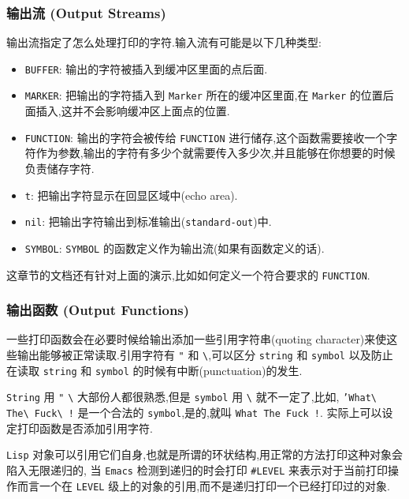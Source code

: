 \documentclass[11pt]{article}
\begin{document}
\subsubsection{输出流 (Output Streams)}
\label{sec:orgdda13f2}

输出流指定了怎么处理打印的字符.输入流有可能是以下几种类型:

\begin{itemize}
\item \texttt{BUFFER}: 输出的字符被插入到缓冲区里面的点后面.
\item \texttt{MARKER}: 把输出的字符插入到 \texttt{Marker} 所在的缓冲区里面,在 \texttt{Marker} 的位置后面插入,这并不会影响缓冲区上面点的位置.
\item \texttt{FUNCTION}: 输出的字符会被传给 \texttt{FUNCTION} 进行储存,这个函数需要接收一个字符作为参数,输出的字符有多少个就需要传入多少次,并且能够在你想要的时候负责储存字符.
\item \texttt{t}: 把输出字符显示在回显区域中(echo area).
\item \texttt{nil}: 把输出字符输出到标准输出(\texttt{standard-out})中.
\item \texttt{SYMBOL}: \texttt{SYMBOL} 的函数定义作为输出流(如果有函数定义的话).
\end{itemize}

这章节的文档还有针对上面的演示,比如如何定义一个符合要求的 \texttt{FUNCTION}.


\subsubsection{输出函数 (Output Functions)}
\label{sec:org056c369}

一些打印函数会在必要时候给输出添加一些引用字符串(quoting character)来使这些输出能够被正常读取.引用字符有 \texttt{"} 和 \texttt{\textbackslash{}},可以区分 \texttt{string} 和 \texttt{symbol} 以及防止在读取 \texttt{string} 和 \texttt{symbol} 的时候有中断(punctuation)的发生.

\texttt{String} 用 \texttt{"} \texttt{\textbackslash{}} 大部份人都很熟悉,但是 \texttt{symbol} 用 \texttt{\textbackslash{}} 就不一定了,比如, \texttt{'What\textbackslash{} The\textbackslash{} Fuck\textbackslash{} !} 是一个合法的 \texttt{symbol},是的,就叫 \texttt{What The Fuck !}. 实际上可以设定打印函数是否添加引用字符.

\texttt{Lisp} 对象可以引用它们自身,也就是所谓的环状结构,用正常的方法打印这种对象会陷入无限递归的, 当 \texttt{Emacs} 检测到递归的时会打印 \texttt{\#LEVEL} 来表示对于当前打印操作而言一个在 \texttt{LEVEL} 级上的对象的引用,而不是递归打印一个已经打印过的对象.
\end{document}

